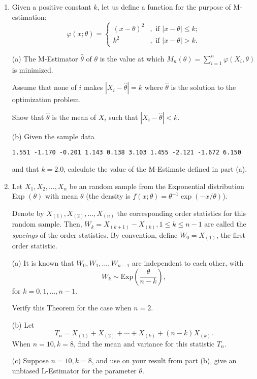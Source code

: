 \begin{enumerate}
\item 
Given a positive constant $k$, let us define a function for the purpose
of M-estimation:
\[ 
\varphi(x; \theta) = 
\begin{cases} 
(x - \theta)^{2} 
&, \text { if } | x - \theta | \leq k; \\ 
k^{2} 
&, \text { if } | x - \theta | > k. 
\end{cases} 
\] 
 
(a) The M-Estimator $ \hat \theta \text { of } \theta $ is the value at which
$ M_{n} ( \theta ) = \sum_{i=1}^{n} \varphi ( X_{i}, \theta ) $ is minimized. 

Assume that none of $i$ makes $ | X_{i} - \hat \theta | = k $
where $\hat \theta$ is the solution to the optimization problem. 

Show that $\hat \theta$ is the mean of $X_{i}$ such that
$ | X_{i} - \hat \theta | < k $. 

(b) Given the sample data 

\begin{verbatim}
1.551 -1.170 -0.201 1.143 0.138 3.103 1.455 -2.121 -1.672 6.150
\end{verbatim}

and that $ k = 2.0 $, calculate the value of the M-Estimate
defined in part (a). 

\item
Let $ X_{1}, X_{2}, ... , X_{n} $ be an \iid random sample 
from the Exponential distribution 
Exp $(\theta ) $ with mean $ \theta $ 
(the density is $ f (x; \theta) = \theta^{ - 1 } \exp ( - x/\theta ) $). 

Denote by $ X_{ (1) }, X_{ (2) }, \ldots, X_{ (n) } $ 
the corresponding order statistics for this random sample. 
Then, $ W_{k} = X_{ (k+1) } - X_{ (k) }, 1 \leq k \leq n - 1 $ 
are called the {\em spacings } of the order statistics. 
By convention, define $ W_{0} = X_{ (1) } $, the first order statistic. 


(a) It is known that $ W_{0}, W_{1}, ... , W_{n - 1} $ 
are independent to each other, with 
\[ 
W_{k} \sim \mbox{Exp} ( \frac { \theta } { n - k } ),  
\]  
for $ k = 0, 1, \ldots, n - 1 $. 

Verify this Theorem for the case when $ n = 2 $. 

(b) Let 
\[
 T_{n} = X_{ (1) } + X_{ (2) } + \cdots + X_{ (k) } + (n - k) X_{ (k) }. 
 \]
When $ n = 10, k = 8 $, find the mean and variance for this statistic $ T_{n} $. 

(c) Suppose $ n = 10, k = 8 $, and use on your result from part (b), 
give an unbiased L-Estimator for the parameter $ \theta $. 

\end{enumerate}

